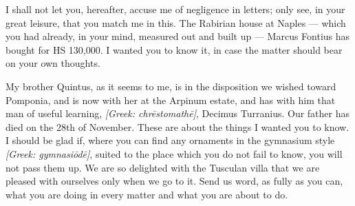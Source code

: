 

 I shall not let you, hereafter, accuse me of negligence in letters; only see, in your great leisure, that you match me in this. The Rabirian house at Naples --- which you had already, in your mind, measured out and built up --- Marcus Fontius has bought for HS 130,000. I wanted you to know it, in case the matter should bear on your own thoughts.

 My brother Quintus, as it seems to me, is in the disposition we wished toward Pomponia, and is now with her at the Arpinum estate, and has with him that man of useful learning, \textit{[Greek: chrēstomathē]}, Decimus Turranius. Our father has died on the 28th of November. These are about the things I wanted you to know. I should be glad if, where you can find any ornaments in the gymnasium style \textit{[Greek: gymnasiōdē]}, suited to the place which you do not fail to know, you will not pass them up. We are so delighted with the Tusculan villa that we are pleased with ourselves only when we go to it. Send us word, as fully as you can, what you are doing in every matter and what you are about to do.

